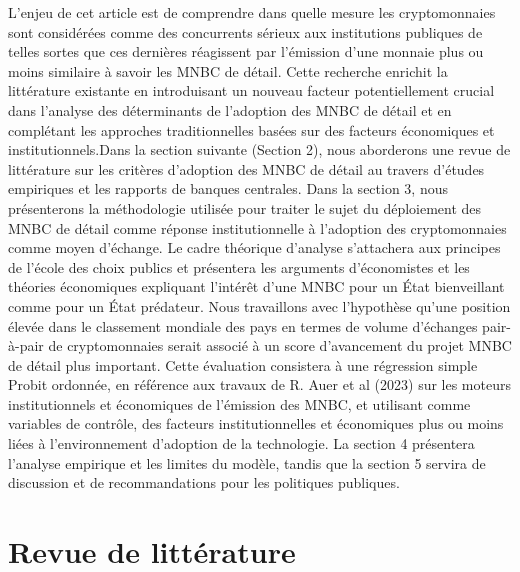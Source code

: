 \documentclass[12pt]{article}
\begin{document}
L'enjeu de cet article est de comprendre dans quelle mesure les cryptomonnaies sont considérées comme des concurrents sérieux aux institutions publiques de telles sortes que ces dernières réagissent par l'émission d'une monnaie plus ou moins similaire à  savoir les MNBC de détail. Cette recherche enrichit la littérature existante en introduisant un nouveau facteur potentiellement crucial dans l'analyse des déterminants de l'adoption des MNBC de détail et en complétant les approches traditionnelles basées sur des facteurs économiques et institutionnels.Dans la section suivante (Section 2), nous aborderons une revue de littérature sur les critères d'adoption des MNBC de détail au travers d'études empiriques et les rapports de banques centrales. Dans la section 3, nous présenterons la méthodologie utilisée pour traiter le sujet du déploiement des MNBC de détail comme réponse institutionnelle à l'adoption des cryptomonnaies comme moyen d'échange. Le cadre théorique d'analyse s'attachera aux principes de l'école des choix publics et présentera les arguments d'économistes et les théories économiques expliquant l'intérêt d'une MNBC pour un État bienveillant comme pour un État prédateur. Nous travaillons avec l'hypothèse qu'une position élevée dans le classement mondiale des pays en termes de volume d'échanges pair-à-pair de cryptomonnaies serait associé à un score d'avancement du projet MNBC de détail plus important. Cette évaluation consistera à une régression simple Probit ordonnée, en référence aux travaux de R. Auer et al (2023) \cite{RePEc:bis:biswps:880} sur les moteurs institutionnels et économiques de l'émission des MNBC, et utilisant comme variables de contrôle, des facteurs institutionnelles et économiques plus ou moins liées à l'environnement d'adoption de la technologie. La section 4 présentera l'analyse empirique et les limites du modèle, tandis que la section 5 servira de discussion et de recommandations pour les politiques publiques.

\clearpage

\section{Revue de littérature}
\end{document}
